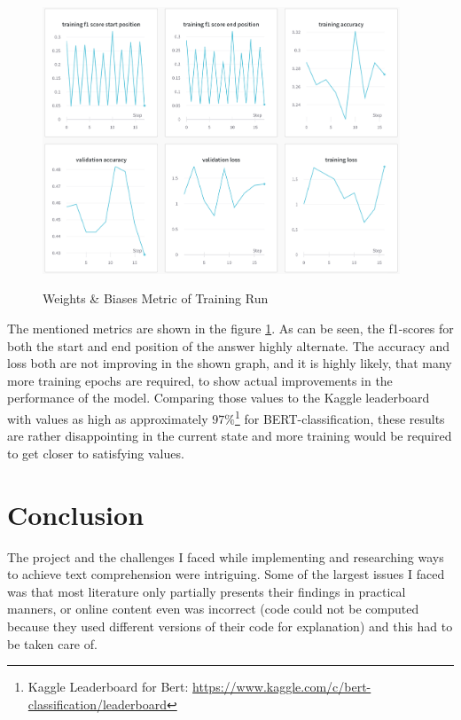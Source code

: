         \begin{figure}[h!]
            \centering
            \caption{Weights \& Biases Metric of Training Run \cite{wandbScreenshot}}
            \includegraphics[width=0.95\textwidth]{figures/wandb_metrics.png}
            \label{fig:-wandb-metric}
        \end{figure}
        The mentioned metrics are shown in the figure \ref{fig:-wandb-metric}.
        As can be seen, the f1-scores for both the start and end position of the answer highly alternate. The accuracy and loss both are not improving in the shown graph, and it is highly likely, that many more training epochs are required, to show actual improvements in the performance of the model.
        Comparing those values to the Kaggle leaderboard with values as high as approximately $97\%$\footnote{Kaggle Leaderboard for Bert: \url{https://www.kaggle.com/c/bert-classification/leaderboard}} for BERT-classification, these results are rather disappointing in the current state and more training would be required to get closer to satisfying values.


\pagebreak
    \section{Conclusion}
    \label{sec:conclusion}

        The project and the challenges I faced while implementing and researching ways to achieve text comprehension were intriguing. 
        Some of the largest issues I faced was that most literature only partially presents their findings in practical manners, or online content even was incorrect (code could not be computed because they used different versions of their code for explanation) and this had to be taken care of.

